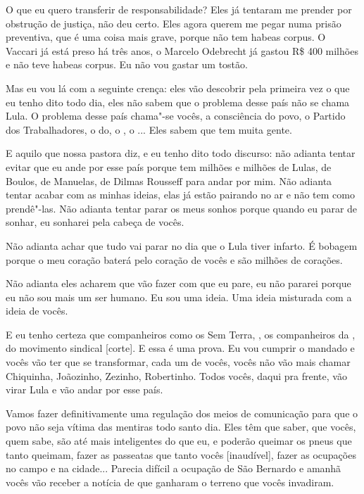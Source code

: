 O que eu quero transferir de responsabilidade? Eles já tentaram me
prender por obstrução de justiça, não deu certo. Eles agora querem me
pegar numa prisão preventiva, que é uma coisa mais grave, porque não tem
habeas corpus. O Vaccari já está preso há três anos, o Marcelo Odebrecht
já gastou R\$ 400 milhões e não teve habeas corpus. Eu não vou gastar um
tostão.

Mas eu vou lá com a seguinte crença: eles vão descobrir pela
primeira vez o que eu tenho dito todo dia, eles não sabem que o problema
desse país não se chama Lula. O problema desse país chama"-se vocês, a
consciência do povo, o Partido dos Trabalhadores, o do, o , o
... Eles sabem que tem muita gente.

E aquilo que nossa pastora diz, e eu tenho dito todo discurso: não
adianta tentar evitar que eu ande por esse país porque tem milhões e
milhões de Lulas, de Boulos, de Manuelas, de Dilmas Rousseff para andar
por mim. Não adianta tentar acabar com as minhas ideias, elas já estão
pairando no ar e não tem como prendê"-las. Não adianta tentar parar os
meus sonhos porque quando eu parar de sonhar, eu sonharei pela cabeça de
vocês.

Não adianta achar que tudo vai parar no dia que o Lula tiver
infarto. É bobagem porque o meu coração baterá pelo coração de vocês e
são milhões de corações.

Não adianta eles acharem que vão fazer com que eu pare, eu não
pararei porque eu não sou mais um ser humano. Eu sou uma ideia. Uma
ideia misturada com a ideia de vocês.

E eu tenho certeza que companheiros como os Sem Terra, , os
companheiros da , do movimento sindical [corte]. E essa é uma
prova. Eu vou cumprir o mandado e vocês vão ter que se transformar, cada
um de vocês, vocês não vão mais chamar Chiquinha, Joãozinho, Zezinho,
Robertinho. Todos vocês, daqui pra frente, vão virar Lula e vão andar
por esse país.

Vamos fazer definitivamente uma regulação dos meios de comunicação
para que o povo não seja vítima das mentiras todo santo dia. Eles têm
que saber, que vocês, quem sabe, são até mais inteligentes do que eu, e
poderão queimar os pneus que tanto queimam, fazer as passeatas que tanto
vocês [inaudível], fazer as ocupações no campo e na cidade...
Parecia difícil a ocupação de São Bernardo e amanhã vocês vão receber a
notícia de que ganharam o terreno que vocês invadiram.

